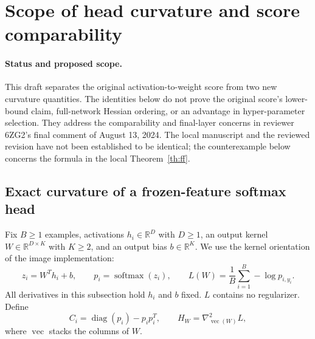 \section{Scope of head curvature and score comparability}%
\label{sec:curvature-audit-draft}

\paragraph{Status and proposed scope.}
This draft separates the original activation-to-weight score from two new curvature quantities. The identities below do not prove the original score's lower-bound claim, full-network Hessian ordering, or an advantage in hyper-parameter selection. They address the comparability and final-layer concerns in reviewer 6ZG2's final comment of August 13, 2024. The local manuscript and the reviewed revision have not been established to be identical; the counterexample below concerns the formula in the local Theorem~\ref{th:ff}.

\subsection{Exact curvature of a frozen-feature softmax head}

Fix $B\geq 1$ examples, activations $h_i\in\mathbb{R}^D$ with $D\geq 1$, an output kernel $W\in\mathbb{R}^{D\times K}$ with $K\geq 2$, and an output bias $b\in\mathbb{R}^K$. We use the kernel orientation of the image implementation:
\begin{equation}
    z_i=W^T h_i+b,\qquad p_i=\operatorname{softmax}(z_i),\qquad
    L(W)=\frac{1}{B}\sum_{i=1}^B -\log p_{i,y_i}.
\end{equation}
All derivatives in this subsection hold $h_i$ and $b$ fixed. $L$ contains no regularizer. Define
\begin{equation}
    C_i=\operatorname{diag}(p_i)-p_i p_i^T,\qquad
    H_W=\nabla^2_{\operatorname{vec}(W)}L,
\end{equation}
where $\operatorname{vec}$ stacks the columns of $W$.

